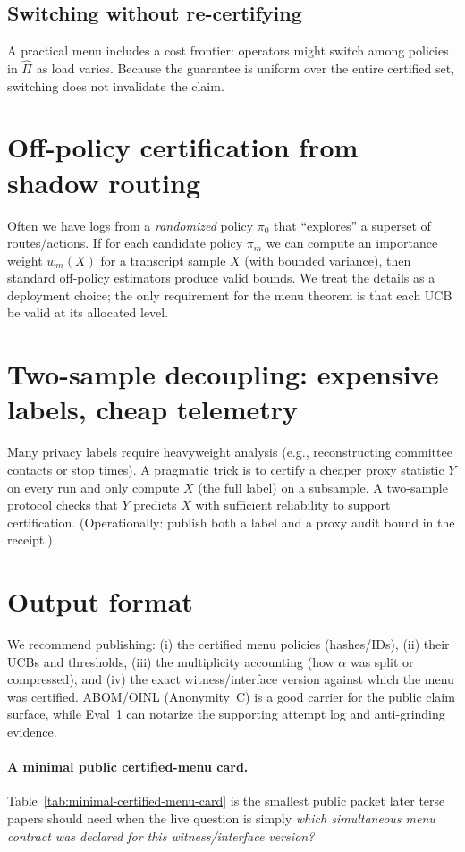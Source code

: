\documentclass[11pt]{article}
\begin{document}
\subsection{Switching without re-certifying}
A practical menu includes a cost frontier:
operators might switch among policies in $\widehat\Pi$ as load varies.
Because the guarantee is uniform over the entire certified set, switching does not invalidate the claim.

\section{Off-policy certification from shadow routing}
Often we have logs from a \emph{randomized} policy $\pi_0$ that ``explores'' a superset of routes/actions.
If for each candidate policy $\pi_m$ we can compute an importance weight $w_m(X)$ for a transcript sample $X$ (with bounded variance), then standard off-policy estimators produce valid bounds.
We treat the details as a deployment choice; the only requirement for the menu theorem is that each $\mathrm{UCB}$ be valid at its allocated level.

\section{Two-sample decoupling: expensive labels, cheap telemetry}
Many privacy labels require heavyweight analysis (e.g., reconstructing committee contacts or stop times).
A pragmatic trick is to certify a cheaper proxy statistic $Y$ on every run and only compute $X$ (the full label) on a subsample.
A two-sample protocol checks that $Y$ predicts $X$ with sufficient reliability to support certification.
(Operationally: publish both a label and a proxy audit bound in the receipt.)

\section{Output format}
We recommend publishing:
(i) the certified menu policies (hashes/IDs),
(ii) their UCBs and thresholds,
(iii) the multiplicity accounting (how $\alpha$ was split or compressed), and
(iv) the exact witness/interface version against which the menu was certified.
ABOM/OINL (Anonymity~C) is a good carrier for the public claim surface, while Eval~1 can notarize the supporting attempt log and anti-grinding evidence.\cite{series:abomoinl,series:eval1}

\paragraph{A minimal public certified-menu card.}
Table~\ref{tab:minimal-certified-menu-card} is the smallest public packet later terse papers should need when the live question is simply \emph{which simultaneous menu contract was declared for this witness/interface version?}
\end{document}
